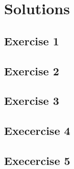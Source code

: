 \section{Solutions}

\subsection{Exercise 1}

\subsection{Exercise 2}

\subsection{Exercise 3}

\subsection{Execercise 4}

\subsection{Execercise 5}
